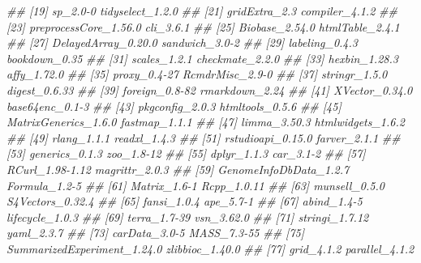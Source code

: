 \documentclass[]{article}
\newcommand{\hlcom}[1]{\textcolor[rgb]{0.502,0.502,0.502}{\textit{#1}}}%
\newenvironment{Shaded}{\begin{myshaded}}{\end{myshaded}}
\newcommand{\DocumentationTok}[1]{\hlcom{#1}}
\begin{document}
\begin{Shaded}
\begin{Highlighting}[]
\DocumentationTok{\#\#  [19] sp\_2.0{-}0                    tidyselect\_1.2.0           }
\DocumentationTok{\#\#  [21] gridExtra\_2.3               compiler\_4.1.2             }
\DocumentationTok{\#\#  [23] preprocessCore\_1.56.0       cli\_3.6.1                  }
\DocumentationTok{\#\#  [25] Biobase\_2.54.0              htmlTable\_2.4.1            }
\DocumentationTok{\#\#  [27] DelayedArray\_0.20.0         sandwich\_3.0{-}2             }
\DocumentationTok{\#\#  [29] labeling\_0.4.3              bookdown\_0.35              }
\DocumentationTok{\#\#  [31] scales\_1.2.1                checkmate\_2.2.0            }
\DocumentationTok{\#\#  [33] hexbin\_1.28.3               affy\_1.72.0                }
\DocumentationTok{\#\#  [35] proxy\_0.4{-}27                RcmdrMisc\_2.9{-}0            }
\DocumentationTok{\#\#  [37] stringr\_1.5.0               digest\_0.6.33              }
\DocumentationTok{\#\#  [39] foreign\_0.8{-}82              rmarkdown\_2.24             }
\DocumentationTok{\#\#  [41] XVector\_0.34.0              base64enc\_0.1{-}3            }
\DocumentationTok{\#\#  [43] pkgconfig\_2.0.3             htmltools\_0.5.6            }
\DocumentationTok{\#\#  [45] MatrixGenerics\_1.6.0        fastmap\_1.1.1              }
\DocumentationTok{\#\#  [47] limma\_3.50.3                htmlwidgets\_1.6.2          }
\DocumentationTok{\#\#  [49] rlang\_1.1.1                 readxl\_1.4.3               }
\DocumentationTok{\#\#  [51] rstudioapi\_0.15.0           farver\_2.1.1               }
\DocumentationTok{\#\#  [53] generics\_0.1.3              zoo\_1.8{-}12                 }
\DocumentationTok{\#\#  [55] dplyr\_1.1.3                 car\_3.1{-}2                  }
\DocumentationTok{\#\#  [57] RCurl\_1.98{-}1.12             magrittr\_2.0.3             }
\DocumentationTok{\#\#  [59] GenomeInfoDbData\_1.2.7      Formula\_1.2{-}5              }
\DocumentationTok{\#\#  [61] Matrix\_1.6{-}1                Rcpp\_1.0.11                }
\DocumentationTok{\#\#  [63] munsell\_0.5.0               S4Vectors\_0.32.4           }
\DocumentationTok{\#\#  [65] fansi\_1.0.4                 ape\_5.7{-}1                  }
\DocumentationTok{\#\#  [67] abind\_1.4{-}5                 lifecycle\_1.0.3            }
\DocumentationTok{\#\#  [69] terra\_1.7{-}39                vsn\_3.62.0                 }
\DocumentationTok{\#\#  [71] stringi\_1.7.12              yaml\_2.3.7                 }
\DocumentationTok{\#\#  [73] carData\_3.0{-}5               MASS\_7.3{-}55                }
\DocumentationTok{\#\#  [75] SummarizedExperiment\_1.24.0 zlibbioc\_1.40.0            }
\DocumentationTok{\#\#  [77] grid\_4.1.2                  parallel\_4.1.2             }

\end{Highlighting}
\end{Shaded}
\end{document}
